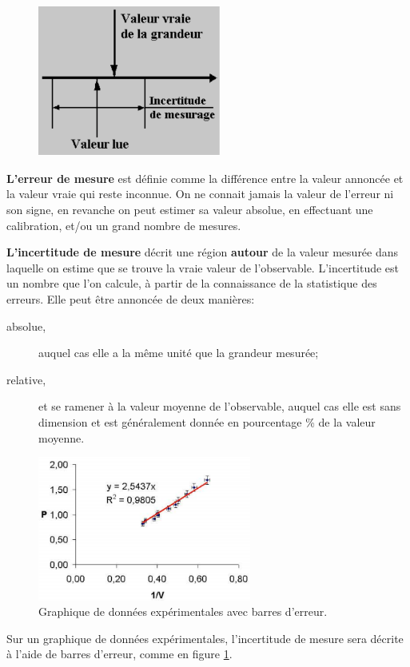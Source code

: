 \begin{figure}
    \centering
    \vspace{-5.5mm}
    \includegraphics[width=6cm]{assets/figures/errinc.pdf}
\end{figure}

\textbf{L'erreur de mesure} est définie comme la différence entre la valeur annoncée et la valeur vraie qui reste inconnue. On ne connait jamais la valeur de l'erreur ni son signe, en revanche on peut estimer sa valeur absolue, en effectuant une calibration, et/ou un grand nombre de mesures.

\textbf{L'incertitude de mesure} décrit une région \textbf{autour} de la valeur mesurée dans laquelle on estime que se trouve la vraie valeur de l'observable. L'incertitude est un nombre que l'on calcule, à partir de la connaissance de la statistique des erreurs. Elle peut être annoncée de deux manières:
\begin{description}
    \item[absolue,] auquel cas elle a la même unité que la grandeur mesurée;
    \item[relative,] et se ramener à la valeur moyenne de l'observable, auquel cas elle est sans dimension et est généralement donnée en pourcentage \% de la valeur moyenne.
\end{description}

\begin{center}
\end{center}

\begin{figure}
    \centering
    \includegraphics[width=7cm]{assets/figures/errbar.pdf}
    \caption{Graphique de données expérimentales avec barres d'erreur.}
    \label{fig:errbar}
\end{figure}
Sur un graphique de données expérimentales, l'incertitude de mesure sera décrite à l'aide de barres d'erreur, comme en figure \ref{fig:errbar}.

